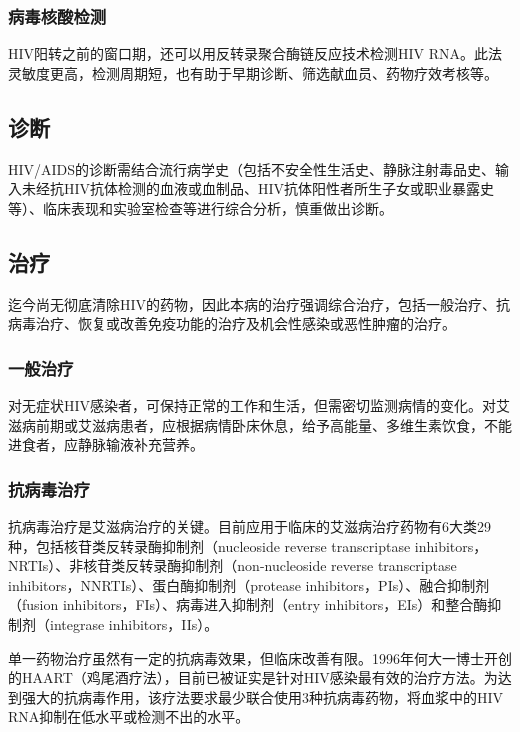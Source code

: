 \subsubsection{病毒核酸检测}

HIV阳转之前的窗口期，还可以用反转录聚合酶链反应技术检测HIV
RNA。此法灵敏度更高，检测周期短，也有助于早期诊断、筛选献血员、药物疗效考核等。

\subsection{诊断}

HIV/AIDS的诊断需结合流行病学史（包括不安全性生活史、静脉注射毒品史、输入未经抗HIV抗体检测的血液或血制品、HIV抗体阳性者所生子女或职业暴露史等）、临床表现和实验室检查等进行综合分析，慎重做出诊断。

\subsection{治疗}

迄今尚无彻底清除HIV的药物，因此本病的治疗强调综合治疗，包括一般治疗、抗病毒治疗、恢复或改善免疫功能的治疗及机会性感染或恶性肿瘤的治疗。

\subsubsection{一般治疗}

对无症状HIV感染者，可保持正常的工作和生活，但需密切监测病情的变化。对艾滋病前期或艾滋病患者，应根据病情卧床休息，给予高能量、多维生素饮食，不能进食者，应静脉输液补充营养。

\subsubsection{抗病毒治疗}

抗病毒治疗是艾滋病治疗的关键。目前应用于临床的艾滋病治疗药物有6大类29种，包括核苷类反转录酶抑制剂（nucleoside
reverse transcriptase
inhibitors，NRTIs）、非核苷类反转录酶抑制剂（non-nucleoside reverse
transcriptase inhibitors，NNRTIs）、蛋白酶抑制剂（protease
inhibitors，PIs）、融合抑制剂（fusion
inhibitors，FIs）、病毒进入抑制剂（entry
inhibitors，EIs）和整合酶抑制剂（integrase inhibitors，IIs）。

单一药物治疗虽然有一定的抗病毒效果，但临床改善有限。1996年何大一博士开创的HAART（鸡尾酒疗法），目前已被证实是针对HIV感染最有效的治疗方法。为达到强大的抗病毒作用，该疗法要求最少联合使用3种抗病毒药物，将血浆中的HIV
RNA抑制在低水平或检测不出的水平。

